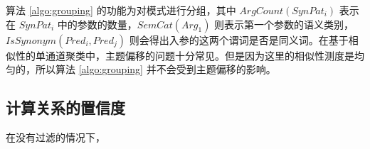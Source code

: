 算法 \ref{algo:grouping} 的功能为对模式进行分组，其中 $ArgCount(SynPat_i)$ 表示在 $SynPat_i$ 中的参数的数量，$SemCat(Arg_1)$ 则表示第一个参数的语义类别，$IsSynonym(Pred_i, Pred_j)$ 则会得出入参的这两个谓词是否是同义词。在基于相似性的单通道聚类中，主题偏移的问题十分常见\citep{papka1998}。但是因为这里的相似性测度是均匀的，所以算法 \ref{algo:grouping} 并不会受到主题偏移的影响。

\subsection{计算关系的置信度}
在没有过滤的情况下，